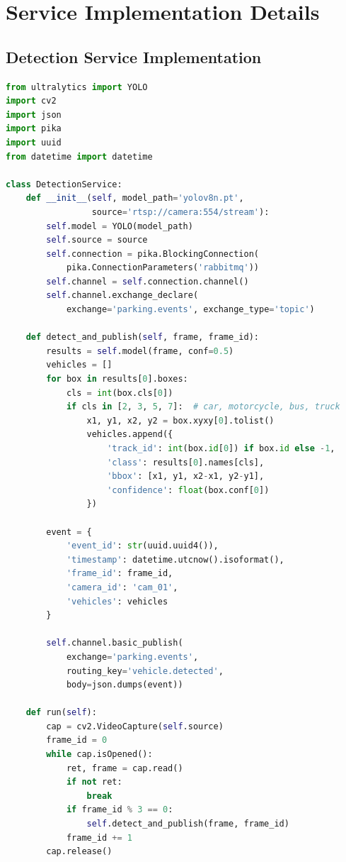 \documentclass[12pt,a4paper]{report}
\begin{document}
\section{Service Implementation Details}

\subsection{Detection Service Implementation}

\begin{lstlisting}[language=Python, caption=Vehicle Detection Core Logic]
from ultralytics import YOLO
import cv2
import json
import pika
import uuid
from datetime import datetime

class DetectionService:
    def __init__(self, model_path='yolov8n.pt',
                 source='rtsp://camera:554/stream'):
        self.model = YOLO(model_path)
        self.source = source
        self.connection = pika.BlockingConnection(
            pika.ConnectionParameters('rabbitmq'))
        self.channel = self.connection.channel()
        self.channel.exchange_declare(
            exchange='parking.events', exchange_type='topic')

    def detect_and_publish(self, frame, frame_id):
        results = self.model(frame, conf=0.5)
        vehicles = []
        for box in results[0].boxes:
            cls = int(box.cls[0])
            if cls in [2, 3, 5, 7]:  # car, motorcycle, bus, truck
                x1, y1, x2, y2 = box.xyxy[0].tolist()
                vehicles.append({
                    'track_id': int(box.id[0]) if box.id else -1,
                    'class': results[0].names[cls],
                    'bbox': [x1, y1, x2-x1, y2-y1],
                    'confidence': float(box.conf[0])
                })

        event = {
            'event_id': str(uuid.uuid4()),
            'timestamp': datetime.utcnow().isoformat(),
            'frame_id': frame_id,
            'camera_id': 'cam_01',
            'vehicles': vehicles
        }

        self.channel.basic_publish(
            exchange='parking.events',
            routing_key='vehicle.detected',
            body=json.dumps(event))

    def run(self):
        cap = cv2.VideoCapture(self.source)
        frame_id = 0
        while cap.isOpened():
            ret, frame = cap.read()
            if not ret:
                break
            if frame_id % 3 == 0:
                self.detect_and_publish(frame, frame_id)
            frame_id += 1
        cap.release()
\end{lstlisting}
\end{document}
